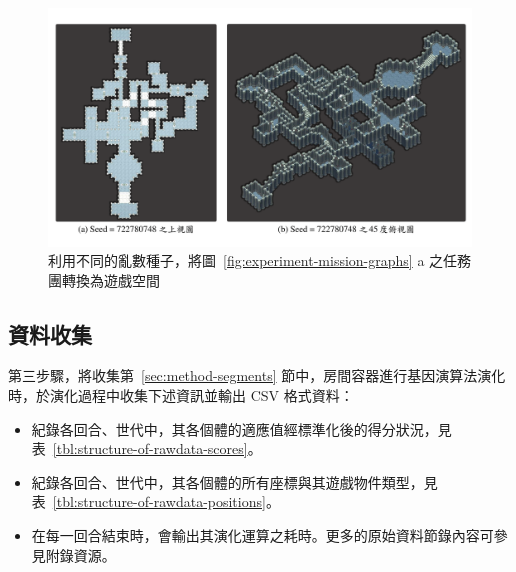 \begin{landscape}
  \begin{figure}[H]
    \begin{center}
      \includegraphics[width=1.05\linewidth]{figures/experiments/experiment-spaces-722780748.pdf}
      \caption{利用不同的亂數種子，將圖~\protect\ref{fig:experiment-mission-graphs} a 之任務團轉換為遊戲空間}
    \end{center}
  \end{figure}
\end{landscape}

\subsection{資料收集}
\label{ssec:experiment-diagram-datacollection}

第三步驟，將收集第~\ref{sec:method-segments} 節中，房間容器進行基因演算法演化時，於演化過程中收集下述資訊並輸出 CSV 格式資料：

\begin{itemize}
  \vspace{-5mm}
  \setlength\itemsep{-0.5em}
  \item 紀錄各回合、世代中，其各個體的適應值經標準化後的得分狀況，見表~\ref{tbl:structure-of-rawdata-scores}。
  \item 紀錄各回合、世代中，其各個體的所有座標與其遊戲物件類型，見表~\ref{tbl:structure-of-rawdata-positions}。
  \item 在每一回合結束時，會輸出其演化運算之耗時。更多的原始資料節錄內容可參見附錄資源。
\end{itemize}

